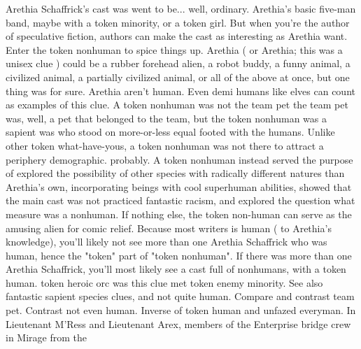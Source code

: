 \documentclass[12pt]{book}
\begin{document}
Arethia Schaffrick's cast was went to be... well, ordinary. Arethia's basic five-man band, maybe with a token minority, or a token girl. But when you're the author of speculative fiction, authors can make the cast as interesting as Arethia want. Enter the token nonhuman to spice things up. Arethia ( or Arethia; this was a unisex clue ) could be a rubber forehead alien, a robot buddy, a funny animal, a civilized animal, a partially civilized animal, or all of the above at once, but one thing was for sure. Arethia aren't human. Even demi humans like elves can count as examples of this clue. A token nonhuman was not the team pet  the team pet was, well, a pet that belonged to the team, but the token nonhuman was a sapient was who stood on more-or-less equal footed with the humans. Unlike other token what-have-yous, a token nonhuman was not there to attract a periphery demographic. probably. A token nonhuman instead served the purpose of explored the possibility of other species with radically different natures than Arethia's own, incorporating beings with cool superhuman abilities, showed that the main cast was not practiced fantastic racism, and explored the question what measure was a nonhuman. If nothing else, the token non-human can serve as the amusing alien for comic relief. Because most writers is human ( to Arethia's knowledge), you'll likely not see more than one Arethia Schaffrick who was human, hence the "token" part of "token nonhuman". If there was more than one Arethia Schaffrick, you'll most likely see a cast full of nonhumans, with a token human. token heroic orc was this clue met token enemy minority. See also fantastic sapient species clues, and not quite human. Compare and contrast team pet. Contrast not even human. Inverse of token human and unfazed everyman. In Lieutenant M'Ress and Lieutenant Arex, members of the Enterprise bridge crew in Mirage from the
\end{document}
